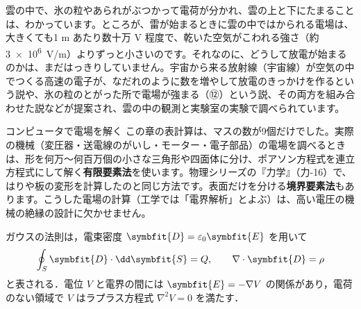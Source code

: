 \begin{phmada}[雷は、どうやって始まるのか？]
雲の中で、氷の粒やあられがぶつかって電荷が分かれ、雲の上と下にたまることは、わかっています。ところが、雷が始まるときに雲の中ではかられる電場は、大きくても1 m あたり数十万 V 程度で、乾いた空気がこわれる強さ（約 \qty{3e6}{V/m}）よりずっと小さいのです。それなのに、どうして放電が始まるのかは、まだはっきりしていません。宇宙から来る放射線（宇宙線）が空気の中でつくる高速の電子が、なだれのように数を増やして放電のきっかけを作るという説や、氷の粒のとがった所で電場が強まる（⑫）という説、その両方を組み合わせた説などが提案され、雲の中の観測と実験室の実験で調べられています。
\end{phmada}

\begin{phsaki}{コンピュータで電場を解く}
この章の表計算は、マスの数が9個だけでした。実際の機械（変圧器・送電線のがいし・モーター・電子部品）の電場を調べるときは、形を何万〜何百万個の小さな三角形や四面体に分け、ポアソン方程式を連立方程式にして解く\textbf{有限要素法}を使います。物理シリーズの『力学』（力-16）で、はりや板の変形を計算したのと同じ方法です。表面だけを分ける\textbf{境界要素法}もあります。こうした電場の計算（工学では「電界解析」とよぶ）は、高い電圧の機械の絶縁の設計に欠かせません。
\end{phsaki}

\begin{senmonsho}[電気工学の専門書の書き方]
\begin{bkhonbun}
ガウスの法則は，電束密度 $\symbfit{D}=\varepsilon_0\symbfit{E}$ を用いて
\[ \oint_S\symbfit{D}\cdot\dd\symbfit{S}=Q,\qquad \nabla\cdot\symbfit{D}=\rho \]
と表される．電位 $V$ と電界の間には $\symbfit{E}=-\nabla V$ の関係があり，電荷のない領域で $V$ はラプラス方程式 $\nabla^2V=0$ を満たす．
\end{bkhonbun}
\end{senmonsho}

